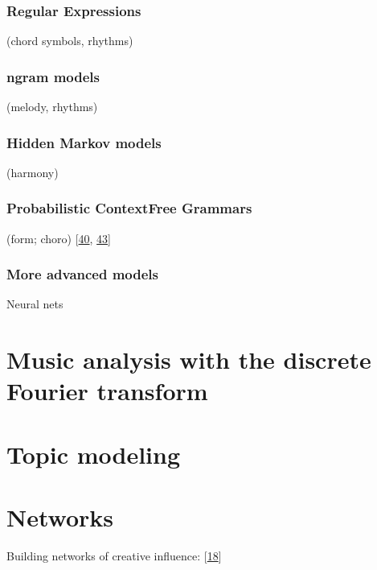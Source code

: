 \documentclass[letterpaper,10pt,english]{sphinxmanual}
\begin{document}
\subsubsection{Regular Expressions}
\label{\detokenize{6_advanced:regular-expressions}}
\sphinxAtStartPar
(chord symbols, rhythms)


\subsubsection{n\sphinxhyphen{}gram models}
\label{\detokenize{6_advanced:n-gram-models}}
\sphinxAtStartPar
(melody, rhythms)


\subsubsection{Hidden Markov models}
\label{\detokenize{6_advanced:hidden-markov-models}}
\sphinxAtStartPar
(harmony)


\subsubsection{Probabilistic Context\sphinxhyphen{}Free Grammars}
\label{\detokenize{6_advanced:probabilistic-context-free-grammars}}
\sphinxAtStartPar
(form; choro)
{[}\hyperlink{cite.8_bibliography:id14}{40}, \hyperlink{cite.8_bibliography:id16}{43}{]}


\subsubsection{More advanced models}
\label{\detokenize{6_advanced:more-advanced-models}}
\sphinxAtStartPar
Neural nets


\section{Music analysis with the discrete Fourier transform}
\label{\detokenize{6_advanced:music-analysis-with-the-discrete-fourier-transform}}

\section{Topic modeling}
\label{\detokenize{6_advanced:topic-modeling}}

\section{Networks}
\label{\detokenize{6_advanced:networks}}
\sphinxAtStartPar
Building networks of creative influence: {[}\hyperlink{cite.8_bibliography:id32}{18}{]}
\end{document}
